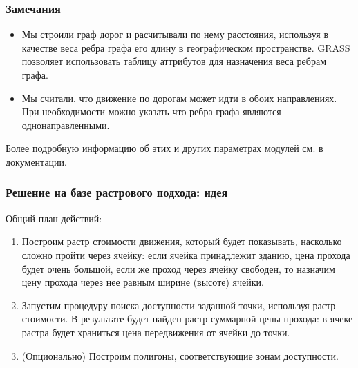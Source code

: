 \begin{frame}
    \frametitle{Замечания}
    \begin{itemize}
        \item Мы строили граф дорог и расчитывали по нему расстояния, используя в качестве веса ребра графа его длину в географическом пространстве. GRASS позволяет использовать таблицу аттрибутов для назначения веса ребрам графа.
        \item Мы считали, что движение по дорогам может идти в обоих направлениях. При необходимости можно указать что ребра графа являются однонаправленными.
    \end{itemize}
    Более подробную информацию об этих и других параметрах модулей см. в документации.
\end{frame}


\begin{frame}
    \frametitle{Решение на базе растрового подхода: идея}
    Общий план действий:
    \begin{enumerate}
        \item Построим растр стоимости движения, который будет показывать, насколько сложно пройти через ячейку: если ячейка принадлежит зданию, цена прохода будет очень большой, если же проход через ячейку свободен, то назначим цену прохода через нее равным ширине (высоте) ячейки.
        \item Запустим процедуру поиска доступности заданной точки, используя растр стоимости. В результате будет найден растр суммарной цены прохода: в ячеке растра будет храниться цена передвижения от ячейки до точки.
        \item (Опционально) Построим полигоны, соответствующие зонам доступности.
    \end{enumerate}
\end{frame}

